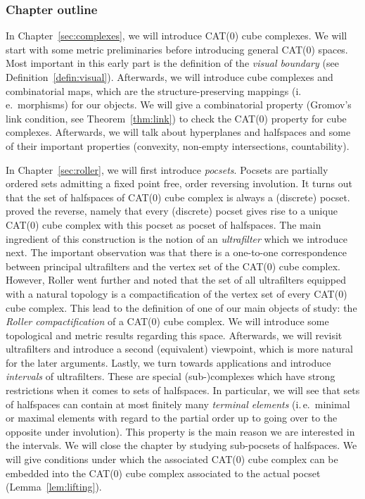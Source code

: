\subsubsection*{Chapter outline}

In Chapter~\ref{sec:complexes}, we will introduce CAT(0) cube complexes. We will start with some metric preliminaries before introducing general CAT(0) spaces. Most important in this early part is the definition of the \emph{visual boundary} (see Definition~\ref{defin:visual}). Afterwards, we will introduce cube complexes and combinatorial maps, which are the structure-preserving mappings (i.\,e.\ morphisms) for our objects. We will give a combinatorial property (Gromov's link condition, see Theorem~\ref{thm:link}) to check the CAT(0) property for cube complexes. Afterwards, we will talk about hyperplanes and halfspaces and some of their important properties (convexity, non-empty intersections, countability).

In Chapter~\ref{sec:roller}, we will first introduce \emph{pocsets}. Pocsets are partially ordered sets admitting a fixed point free, order reversing involution. It turns out that the set of halfspaces of CAT(0) cube complex is always a (discrete) pocset. \textcite{Roller1999} proved the reverse, namely that every (discrete) pocset gives rise to a unique CAT(0) cube complex with this pocset as pocset of halfspaces. The main ingredient of this construction is the notion of an \emph{ultrafilter} which we introduce next. The important observation was that there is a one-to-one correspondence between principal ultrafilters and the vertex set of the CAT(0) cube complex. However, Roller went further and noted that the set of all ultrafilters equipped with a natural topology is a compactification of the vertex set of every CAT(0) cube complex. This lead to the definition of one of our main objects of study: the \emph{Roller compactification} of a CAT(0) cube complex. We will introduce some topological and metric results regarding this space. Afterwards, we will revisit ultrafilters and introduce a second (equivalent) viewpoint, which is more natural for the later arguments. Lastly, we turn towards applications and introduce \emph{intervals} of ultrafilters. These are special (sub-)complexes which have strong restrictions when it comes to sets of halfspaces. In particular, we will see that sets of halfspaces can contain at most finitely many \emph{terminal elements} (i.\,e.\ minimal or maximal elements with regard to the partial order up to going over to the opposite under involution). This property is the main reason we are interested in the intervals. We will close the chapter by studying sub-pocsets of halfspaces. We will give conditions under which the associated CAT(0) cube complex can be embedded into the CAT(0) cube complex associated to the actual pocset (Lemma~\ref{lem:lifting}). 

